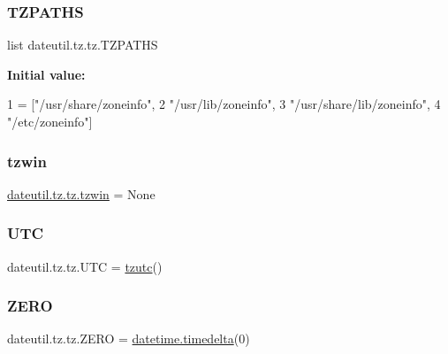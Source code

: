 \subsubsection{\texorpdfstring{T\+Z\+P\+A\+T\+HS}{TZPATHS}}
{\footnotesize\ttfamily list dateutil.\+tz.\+tz.\+T\+Z\+P\+A\+T\+HS}

{\bfseries Initial value\+:}
\begin{DoxyCode}
1 =  [\textcolor{stringliteral}{"/usr/share/zoneinfo"},
2                \textcolor{stringliteral}{"/usr/lib/zoneinfo"},
3                \textcolor{stringliteral}{"/usr/share/lib/zoneinfo"},
4                \textcolor{stringliteral}{"/etc/zoneinfo"}]
\end{DoxyCode}
\mbox{\label{namespacedateutil_1_1tz_1_1tz_ace91b67b861e0dac4377e44790fc2f75}} 
\subsubsection{\texorpdfstring{tzwin}{tzwin}}
{\footnotesize\ttfamily \hyperlink{classdateutil_1_1tz_1_1win_1_1tzwin}{dateutil.\+tz.\+tz.\+tzwin} = None}

\mbox{\label{namespacedateutil_1_1tz_1_1tz_ab991c64e6818646df618e99674cbdf41}} 
\subsubsection{\texorpdfstring{U\+TC}{UTC}}
{\footnotesize\ttfamily dateutil.\+tz.\+tz.\+U\+TC = \hyperlink{classdateutil_1_1tz_1_1tz_1_1tzutc}{tzutc}()}

\mbox{\label{namespacedateutil_1_1tz_1_1tz_a18378431357829ceeb09d65400bbc865}} 
\subsubsection{\texorpdfstring{Z\+E\+RO}{ZERO}}
{\footnotesize\ttfamily dateutil.\+tz.\+tz.\+Z\+E\+RO = \hyperlink{noprefix_8h_ae6feacec25f59b525f6e0c442ef75ff7}{datetime.\+timedelta}(0)}

